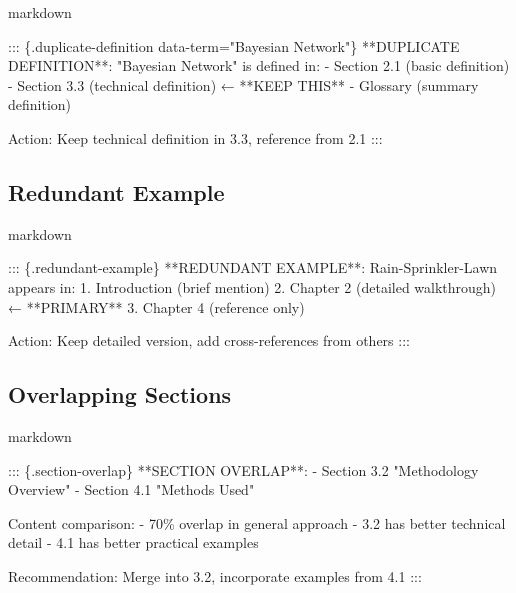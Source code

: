 \documentclass[
  11pt,
  letterpaper,
]{book}
\newenvironment{Shaded}{\begin{snugshade}}{\end{snugshade}}
\newcommand{\NormalTok}[1]{\textcolor[rgb]{0.00,0.23,0.31}{#1}}
\newcommand{\SpecialStringTok}[1]{\textcolor[rgb]{0.13,0.47,0.30}{#1}}
\begin{document}
markdown

\begin{Shaded}
\begin{Highlighting}[]
\NormalTok{::: \{.duplicate{-}definition data{-}term="Bayesian Network"\}}
\NormalTok{**DUPLICATE DEFINITION**: "Bayesian Network" is defined in:}
\SpecialStringTok{{-} }\NormalTok{Section 2.1 (basic definition)}
\SpecialStringTok{{-} }\NormalTok{Section 3.3 (technical definition) ← **KEEP THIS**}
\SpecialStringTok{{-} }\NormalTok{Glossary (summary definition)}

\NormalTok{Action: Keep technical definition in 3.3, reference from 2.1}
\NormalTok{:::}
\end{Highlighting}
\end{Shaded}

\subsection*{Redundant Example}\label{redundant-example}

markdown

\begin{Shaded}
\begin{Highlighting}[]
\NormalTok{::: \{.redundant{-}example\}}
\NormalTok{**REDUNDANT EXAMPLE**: Rain{-}Sprinkler{-}Lawn appears in:}
\SpecialStringTok{1. }\NormalTok{Introduction (brief mention)}
\SpecialStringTok{2. }\NormalTok{Chapter 2 (detailed walkthrough) ← **PRIMARY**}
\SpecialStringTok{3. }\NormalTok{Chapter 4 (reference only)}

\NormalTok{Action: Keep detailed version, add cross{-}references from others}
\NormalTok{:::}
\end{Highlighting}
\end{Shaded}

\subsection*{Overlapping Sections}\label{overlapping-sections}

markdown

\begin{Shaded}
\begin{Highlighting}[]
\NormalTok{::: \{.section{-}overlap\}}
\NormalTok{**SECTION OVERLAP**: }
\SpecialStringTok{{-} }\NormalTok{Section 3.2 "Methodology Overview" }
\SpecialStringTok{{-} }\NormalTok{Section 4.1 "Methods Used"}

\NormalTok{Content comparison:}
\SpecialStringTok{{-} }\NormalTok{70\% overlap in general approach}
\SpecialStringTok{{-} }\NormalTok{3.2 has better technical detail}
\SpecialStringTok{{-} }\NormalTok{4.1 has better practical examples}

\NormalTok{Recommendation: Merge into 3.2, incorporate examples from 4.1}
\NormalTok{:::}
\end{Highlighting}
\end{Shaded}
\end{document}
